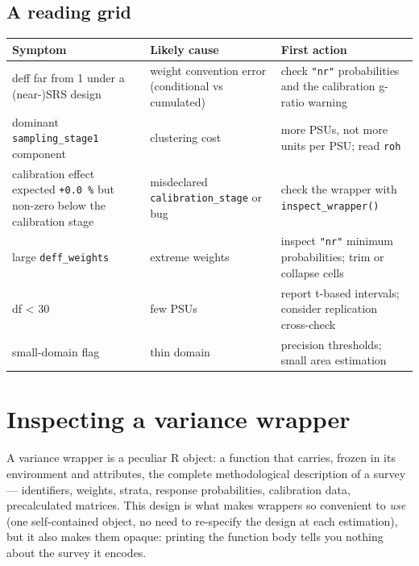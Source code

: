 \documentclass[
]{article}
\newcounter{none} %
\begin{document}
\subsection{A reading grid}\label{a-reading-grid}

{\def\LTcaptype{none} %
\begin{longtable}[]{@{}
  >{\raggedright\arraybackslash}p{}
  >{\raggedright\arraybackslash}p{}
  >{\raggedright\arraybackslash}p{}@{}}
\toprule\noalign{}
\begin{minipage}[b]{\linewidth}\raggedright
Symptom
\end{minipage} & \begin{minipage}[b]{\linewidth}\raggedright
Likely cause
\end{minipage} & \begin{minipage}[b]{\linewidth}\raggedright
First action
\end{minipage} \\
\midrule\noalign{}
\endhead
\bottomrule\noalign{}
\endlastfoot
deff far from 1 under a (near-)SRS design & weight convention error
(conditional vs cumulated) & check \texttt{"nr"} probabilities and the
calibration g-ratio warning \\
dominant \texttt{sampling\_stage1} component & clustering cost & more
PSUs, not more units per PSU; read \texttt{roh} \\
calibration effect expected \texttt{+0.0\ \%} but non-zero below the
calibration stage & misdeclared \texttt{calibration\_stage} or bug &
check the wrapper with \texttt{inspect\_wrapper()} \\
large \texttt{deff\_weights} & extreme weights & inspect \texttt{"nr"}
minimum probabilities; trim or collapse cells \\
df \textless{} 30 & few PSUs & report t-based intervals; consider
replication cross-check \\
small-domain flag & thin domain & precision thresholds; small area
estimation \\
\end{longtable}
}

\section{Inspecting a variance
wrapper}\label{inspecting-a-variance-wrapper}

A variance wrapper is a peculiar R object: a function that carries,
frozen in its environment and attributes, the complete methodological
description of a survey --- identifiers, weights, strata, response
probabilities, calibration data, precalculated matrices. This design is
what makes wrappers so convenient to \emph{use} (one self-contained
object, no need to re-specify the design at each estimation), but it
also makes them opaque: printing the function body tells you nothing
about the survey it encodes.
\end{document}
